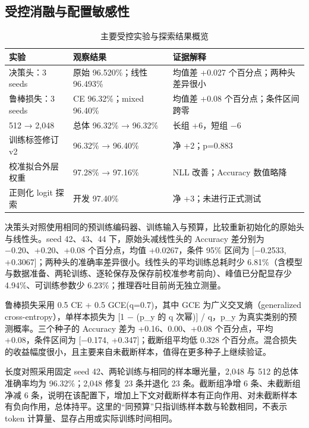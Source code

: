 \documentclass[UTF8,fontset=fandol,a4paper,11pt]{ctexart}
\begin{document}
\subsection{受控消融与配置敏感性}
\begin{table}[htbp]\centering\caption{主要受控实验与探索结果概览}\label{tab:t5}\small\renewcommand{\arraystretch}{1.25}
\begin{tabularx}{\linewidth}{YYY}\toprule
\textbf{实验} & \textbf{观察结果} & \textbf{证据解释}\\\midrule
决策头：3 seeds & 原始 96.520\%；线性 96.493\% & 均值差 +0.027 个百分点；两种头差异很小\\
鲁棒损失：3 seeds & CE 96.32\%；mixed 96.40\% & 均值差 +0.08 个百分点；条件区间跨零\\
512 → 2,048 & 总体 96.32\% → 96.32\% & 长组 +6，短组 −6\\
训练标签修订 v2 & 96.32\% → 96.40\% & 净 +2；p=0.883\\
校准拟合外层权重 & 97.28\% → 97.16\% & NLL 改善；Accuracy 数值略降\\
正则化 logit 探索 & 开发 97.40\% & 净 +3；未进行正式测试\\
\bottomrule\end{tabularx}\end{table}
决策头对照使用相同的预训练编码器、训练输入与预算，比较重新初始化的原始头与线性头。seed 42、43、44 下，原始头减线性头的 Accuracy 差分别为 −0.20、+0.20、+0.08 个百分点，均值 +0.0267，条件 95\% 区间为 [−0.2533, +0.3067]；两种头的准确率差异很小。线性头的平均训练总耗时少 6.81\%（含模型与数据准备、两轮训练、逐轮保存及保存前校准参考前向）、峰值已分配显存少 4.94\%、可训练参数少 6.23\%；推理吞吐目前尚无独立测量。

鲁棒损失采用 0.5 CE + 0.5 GCE(q=0.7)，其中 GCE 为广义交叉熵（generalized cross-entropy）\cite{gce}，单样本损失为 [1 − (p\_y 的 q 次幂)] / q，p\_y 为真实类别的预测概率。三个种子的 Accuracy 差为 +0.16、0.00、+0.08 个百分点，平均 +0.08，条件区间为 [−0.174, +0.347]；截断组平均低 0.328 个百分点。混合损失的收益幅度很小，且主要来自未截断样本，值得在更多种子上继续验证。

长度对照采用固定 seed 42、两轮训练与相同的样本曝光量，2,048 与 512 的总体准确率均为 96.32\%；2,048 修复 23 条并退化 23 条。截断组净增 6 条、未截断组净减 6 条，说明在该配置下，增加上下文对截断样本有正向作用、对未截断样本有负向作用，总体持平。这里的“同预算”只指训练样本数与轮数相同，不表示 token 计算量、显存占用或实际训练时间相同。
\end{document}
